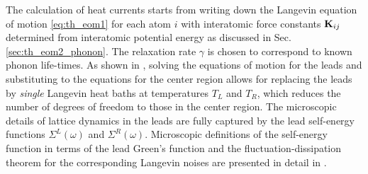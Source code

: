 The calculation of heat currents starts from writing down the Langevin equation of motion \eqref{eq:th_eom1} for each atom $i$ with interatomic force constants $\mathbf{K}_{ij}$ determined from interatomic potential energy as discussed in Sec. \ref{sec:th_eom2_phonon}. The relaxation rate $\gamma$ is chosen to correspond to known phonon life-times. As shown in , solving the equations of motion for the leads and substituting to the equations for the center region allows for replacing the leads by \textit{single} Langevin heat baths at temperatures $T_L$ and $T_R$, which reduces the number of degrees of freedom to those in the center region. The microscopic details of lattice dynamics in the leads are fully captured by the lead self-energy functions $\Sigma^L(\omega)$ and $\Sigma^R(\omega)$. Microscopic definitions of the self-energy function in terms of the lead Green's function and the fluctuation-dissipation theorem for the corresponding Langevin noises are presented in detail in .





